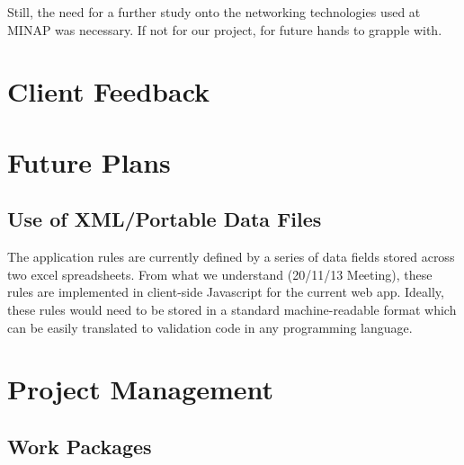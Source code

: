 \documentclass[12pt,a4paper,oneside,titlepage]{article}
\begin{document}
Still, the need for a further study onto the networking technologies used at MINAP was necessary. If not for our project, for future hands to grapple with.

\newpage
\section{Client Feedback}

\newpage
\section{Future Plans}
\subsection{Use of XML/Portable Data Files}
The application rules are currently defined by a series of data fields stored across two excel spreadsheets. From what we understand (20/11/13 Meeting), these rules are implemented in client-side Javascript for the current web app. Ideally, these rules would need to be stored in a standard machine-readable format which can be easily translated to validation code in any programming language.

\newpage
\section{Project Management}


\subsection{Work Packages}
\end{document}
